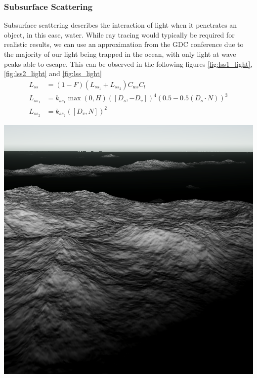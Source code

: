 \subsubsection{Subsurface Scattering}

Subsurface scattering describes the interaction of light when it penetrates an object, in this case, water. While ray tracing would typically be required for realistic results, we can use an approximation from the GDC conference \cite{mark2021} due to the majority of our light being trapped in the ocean, with only light at wave peaks able to escape. This can be observed in the following figures \ref{fig:lss1_light}, \ref{fig:lss2_light} and \ref{fig:lss_light}
\begin{equation}
    \begin{split}
        L_{ss} &= (1-F) (L_{ss_1} + L_{ss_2}) C_{ws} C_l\\
        L_{ss_1} &= k_{ss_1} \max(0, H) ([D_s, -D_v])^{4}(0.5-0.5(D_s \cdot N))^{3}\\
        L_{ss_2} &= k_{ss_2} ([D_{v}, N])^{2}
    \end{split}
\end{equation}
\begin{minipage}[t]{0.32\textwidth}
    \includegraphics[width=1\textwidth]{"images/ss1_light.png"}
    \label{fig:lss1_light}
\end{minipage}
